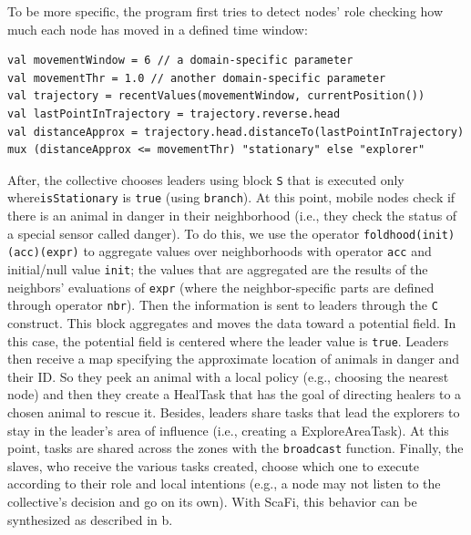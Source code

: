 \documentclass[jsan,article,accept,moreauthors,pdftex]{Definitions/mdpi}
\begin{document}
\begin{paracol}{2}
To be more specific, 
 the program first tries to detect nodes' role 
 checking how much each node has moved in a defined time window:
\begin{lstlisting}
val movementWindow = 6 // a domain-specific parameter
val movementThr = 1.0 // another domain-specific parameter
val trajectory = recentValues(movementWindow, currentPosition())
val lastPointInTrajectory = trajectory.reverse.head
val distanceApprox = trajectory.head.distanceTo(lastPointInTrajectory)
mux (distanceApprox <= movementThr) "stationary" else "explorer"
\end{lstlisting}
%

After, the collective chooses leaders using block \lstinline!S! that is executed
 only where\linebreak  \lstinline!isStationary! is \lstinline!true! (using \lstinline!branch!).
%
At this point, mobile nodes check if there is an animal 
 in danger in their neighborhood (i.e., they check the status of a 
 special sensor called danger). 
% 
To do this, we use the operator \lstinline|foldhood(init)(acc)(expr)|
 to aggregate values over neighborhoods with operator \lstinline|acc| and initial/null value \lstinline|init|; the values that are aggregated are the results of the neighbors' evaluations of \lstinline|expr| (where the neighbor-specific parts are defined through operator \lstinline|nbr|).
%
Then the information is sent to leaders through the \lstinline|C| construct.
 This block aggregates and moves the data toward a potential field. 
 In this case, the potential field is centered where the leader value is \lstinline!true!.
%
Leaders then receive a map specifying 
 the approximate location of animals in danger and their ID.
 So they peek an animal with a local policy 
 (e.g., choosing the nearest node) and then they create a {HealTask} 
 that has the goal of directing healers to a chosen animal to 
 rescue it. Besides, leaders share tasks that lead the explorers 
 to stay in the leader's area of influence (i.e., creating a {ExploreAreaTask}).
%
At this point, tasks are shared across 
 the zones with the \lstinline|broadcast| function.
%
Finally, the slaves, who receive the various tasks created,
 choose which one to execute according to their role and 
 local intentions (e.g., a node may not listen to 
 the collective's decision and go on its own).
%
With ScaFi, this behavior can be synthesized as described in b.
%


\clearpage
\end{paracol}
\end{document}
